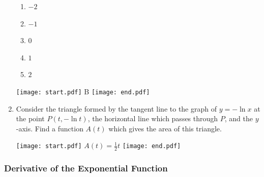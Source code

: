 \documentclass[12pt]{article}
\begin{document}
\begin{enumerate}
\begin{enumerate}
\item $-2$

\item $-1$

\item $0$

\item $1$

\item $2$

\end{enumerate}

\texttt{[image: start.pdf]}
{{B}}
\texttt{[image: end.pdf]}


\item Consider the triangle formed by the tangent line to the graph of $y=-\ln{x}$ at the point $P(t,-\ln{t})$, the horizontal line which passes through $P$, and the $y$-axis. Find a function $A(t)$ which gives the area of this triangle.  

\texttt{[image: start.pdf]}
{{$A(t)=\frac{1}{2}t$}}
\texttt{[image: end.pdf]}


\end{enumerate}

\subsubsection*{Derivative of the Exponential Function}

\end{document}

